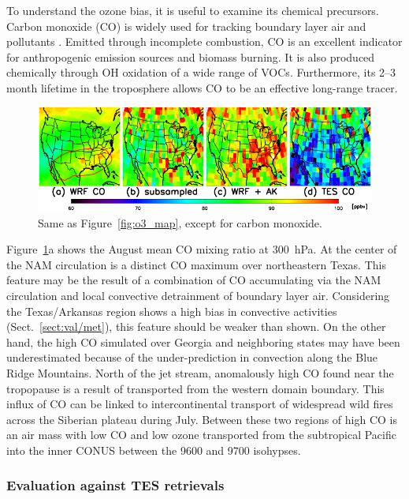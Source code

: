 To understand the ozone bias, it is useful to examine its chemical precursors. Carbon
monoxide (CO) is widely used for tracking boundary layer air and pollutants
\citep[e.g.][]{Pan:2007sw,Weinstock:2007yj}. Emitted through incomplete
combustion, CO  is an excellent indicator for anthropogenic emission sources and
biomass burning. It is also produced chemically through OH oxidation of a wide range
of VOCs. Furthermore, its 2--3 month lifetime in the troposphere allows CO to be an
effective long-range tracer.

 \begin{figure}
 \noindent\includegraphics[width=40pc]{figures/co/tes08_co.png}
 \caption{Same as Figure~\ref{fig:o3_map}, except for carbon monoxide.}
 \label{fig:co_map}
 \end{figure}

Figure~\ref{fig:co_map}a shows the August mean CO mixing ratio at 300~hPa. At the
center of the NAM circulation is a distinct CO maximum over northeastern Texas. This
feature may be the result of a combination of CO accumulating via the NAM circulation
and local convective detrainment of boundary layer air. Considering the Texas/Arkansas region
shows a high bias in convective activities (Sect.~\ref{sect:val/met}), this feature
should be weaker than shown. On the other hand, the high CO simulated over
Georgia and neighboring states may have been underestimated because of the
under-prediction in convection along the Blue Ridge Mountains. North of the
jet stream, anomalously high CO found near the tropopause is a result of transported from the
western domain boundary. This influx of CO can be linked to intercontinental transport
of widespread wild fires across the Siberian plateau during July. Between these two regions
of high CO is an air mass with low CO and low ozone transported from the
subtropical Pacific into the inner CONUS between the 9600 and 9700 isohypses.

\subsubsection{Evaluation against TES retrievals}

